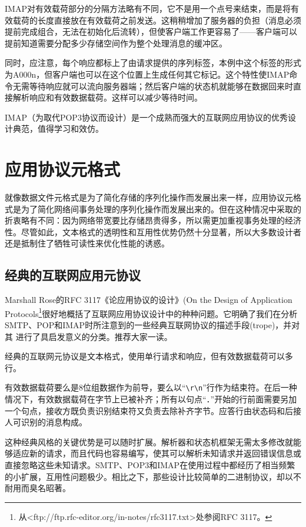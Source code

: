 \documentclass[12pt,oneside]{book}
\begin{document}
IMAP对有效载荷部分的分隔方法略有不同，它不是用一个点号来结束，而是将有效载荷的长度直接放在有效载荷之前发送。这稍稍增加了服务器的负担（消息必须提前完成组合，无法在初始化后流转），但使客户端工作更容易了——客户端可以提前知道需要分配多少存储空间作为整个处理消息的缓冲区。

同时，应注意，每个响应都标上了由请求提供的序列标签，本例中这个标签的形式为A000n，但客户端也可以在这个位置上生成任何其它标记。这个特性使IMAP命令无需等待响应就可以流向服务器端；然后客户端的状态机就能够在数据回来时直接解析响应和有效数据载荷。这样可以减少等待时间。

IMAP（为取代POP3协议而设计）是一个成熟而强大的互联网应用协议的优秀设计典范，值得学习和效仿。


\section{应用协议元格式}
就像数据文件元格式是为了简化存储的序列化操作而发展出来一样，应用协议元格式是为了简化网络间事务处理的序列化操作而发展出来的。但在这种情况中采取的折衷略有不同：因为网络带宽要比存储昂贵得多，所以需更加重视事务处理的经济性。尽管如此，文本格式的透明性和互用性优势仍然十分显著，所以大多数设计者还是抵制住了牺牲可读性来优化性能的诱惑。

\subsection{经典的互联网应用元协议}
Marshall Rose的RFC 3117《论应用协议的设计》(On the Design of Application Protocols\footnote{从<ftp://ftp.rfc-editor.org/in-notes/rfc3117.txt>处参阅RFC 3117。}很好地概括了互联网应用协议设计中的种种问题。它明确了我们在分析SMTP、POP和IMAP时所注意到的一些经典互联网协议的描述手段(trope)，并对其
进行了具启发意义的分类。推荐大家一读。

经典的互联网元协议是文本格式，使用单行请求和响应，但有效数据载荷可以多行。

有效数据载荷要么是8位组数据作为前导，要么以“\verb+\r\n+”行作为结束符。在后一种情况下，有效数据载荷在字节上已被补齐；所有以句点“．”开始的行前面需要另加一个句点，接收方既负责识别结束符又负责去除补齐字节。应答行由状态码和后接人可识别的消息构成。

这种经典风格的关键优势是可以随时扩展。解析器和状态机框架无需太多修改就能够适应新的请求，而且代码也容易编写，使其可以解析未知请求并返回错误信息或直接忽略这些未知请求。SMTP、POP3和IMAP在使用过程中都经历了相当频繁的小扩展，互用性问题极少。相比之下，那些设计比较简单的二进制协议，却以不耐用而臭名昭著。
\end{document}
